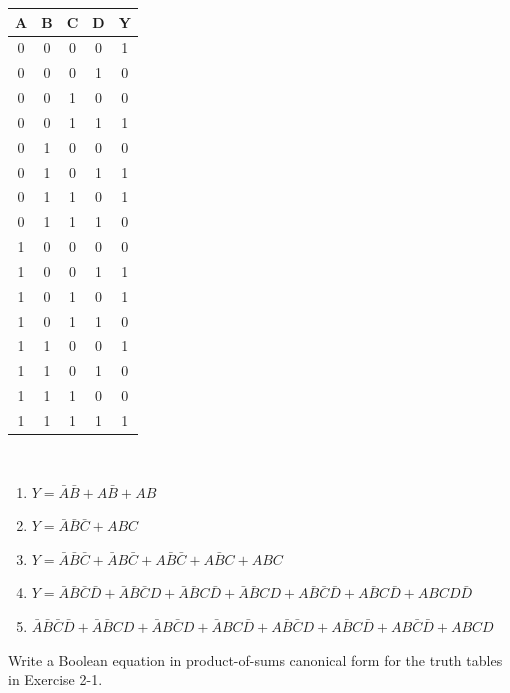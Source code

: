 \documentclass[12pt]{article}
\newenvironment{ex}[2][Exercise]{\begin{trivlist}
		\item[\hskip \labelsep {\bfseries #1}\hskip \labelsep {\bfseries #2.}]}{\end{trivlist}}
\newenvironment{sol}[1][Solution]{\begin{trivlist}
		\item[\hskip \labelsep {\bfseries #1:}]}{\end{trivlist}}
\begin{document}
\begin{ex}{2.1}
\begin{center}
\begin{enumerate*}[label=(\alph*)]
			\begin{tabular}{cccc|c}
				A & B & C & D & Y \\
				\hline
				0 & 0 & 0 & 0 & 1\\
				0 & 0 & 0 & 1 & 0\\
				0 & 0 & 1 & 0 & 0\\
				0 & 0 & 1 & 1 & 1\\
				0 & 1 & 0 & 0 & 0\\
				0 & 1 & 0 & 1 & 1\\
				0 & 1 & 1 & 0 & 1\\
				0 & 1 & 1 & 1 & 0\\
				1 & 0 & 0 & 0 & 0\\
				1 & 0 & 0 & 1 & 1\\
				1 & 0 & 1 & 0 & 1\\
				1 & 0 & 1 & 1 & 0\\
				1 & 1 & 0 & 0 & 1\\
				1 & 1 & 0 & 1 & 0\\
				1 & 1 & 1 & 0 & 0\\
				1 & 1 & 1 & 1 & 1\\
			\end{tabular}
		\end{enumerate*}
	\end{center}
\end{ex}

\begin{sol} \
	\begin{enumerate}[label=(\alph*)]
		\item $Y=\bar{A}\bar{B}+A\bar{B}+AB$
		\item $Y=\bar{A}\bar{B}\bar{C}+ABC$
		\item $Y=\bar{A}\bar{B}\bar{C}+\bar{A}B\bar{C}+A\bar{B}\bar{C}+A\bar{B}C+ABC$
		\item $Y=\bar{A}\bar{B}\bar{C}\bar{D}+\bar{A}\bar{B}\bar{C}D+\bar{A}\bar{B}C\bar{D}+\bar{A}\bar{B}CD+A\bar{B}\bar{C}\bar{D}+A\bar{B}C\bar{D}+ABCD\bar{D}$
		\item $\bar{A}\bar{B}\bar{C}\bar{D}+\bar{A}\bar{B}CD+\bar{A}B\bar{C}D+\bar{A}BC\bar{D}+A\bar{B}\bar{C}D+A\bar{B}C\bar{D}+AB\bar{C}\bar{D}+ABCD$
	\end{enumerate}
\end{sol}

\begin{ex}{2-3}
	Write a Boolean equation in product-of-sums canonical form for the truth tables in Exercise 2-1.
\end{ex}
\end{document}
